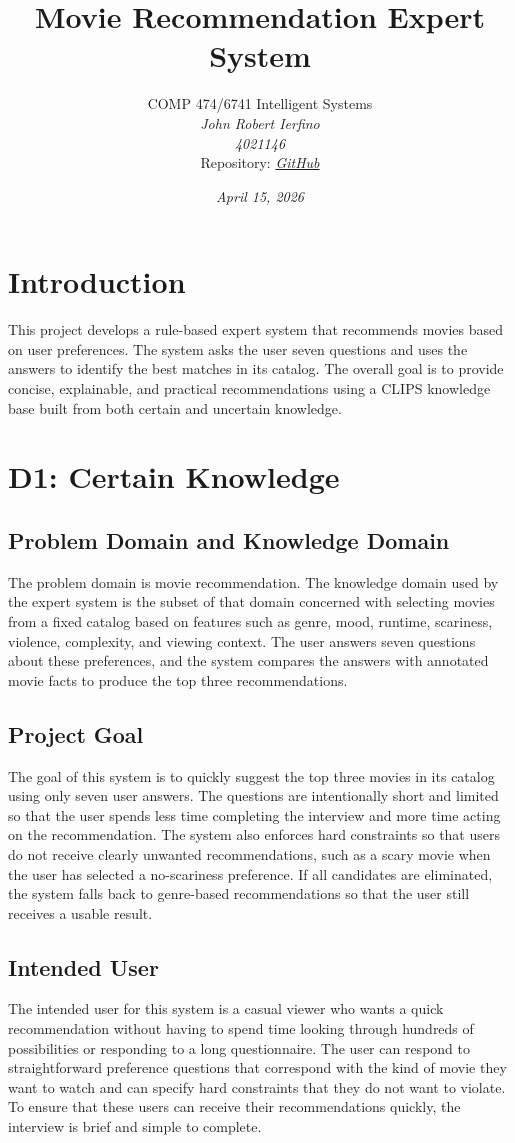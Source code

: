 \documentclass[11pt]{article}
\title{\textbf{Movie Recommendation Expert System}}
\author{
COMP 474/6741 Intelligent Systems\\
\textit{John Robert Ierfino}\\
\textit{4021146}\\
Repository: \href{https://github.com/jrierfino/Comp6741-clips-movie-recommender}{\textit{GitHub}}
}
\date{\textit{April 15, 2026}}
\begin{document}
\maketitle
\tableofcontents
\newpage

\section{Introduction}
This project develops a rule-based expert system that recommends movies based on user preferences. The system asks the user seven questions and uses the answers to identify the best matches in its catalog. The overall goal is to provide concise, explainable, and practical recommendations using a CLIPS knowledge base built from both certain and uncertain knowledge.

\section{D1: Certain Knowledge}

\subsection{Problem Domain and Knowledge Domain}
The problem domain is movie recommendation. The knowledge domain used by the expert system is the subset of that domain concerned with selecting movies from a fixed catalog based on features such as genre, mood, runtime, scariness, violence, complexity, and viewing context. The user answers seven questions about these preferences, and the system compares the answers with annotated movie facts to produce the top three recommendations.

\subsection{Project Goal}
The goal of this system is to quickly suggest the top three movies in its catalog using only seven user answers. The questions are intentionally short and limited so that the user spends less time completing the interview and more time acting on the recommendation. The system also enforces hard constraints so that users do not receive clearly unwanted recommendations, such as a scary movie when the user has selected a no-scariness preference. If all candidates are eliminated, the system falls back to genre-based recommendations so that the user still receives a usable result.

\subsection{Intended User}
The intended user for this system is a casual viewer who wants a quick recommendation without having to spend time looking through hundreds of possibilities or responding to a long questionnaire. The user can respond to straightforward preference questions that correspond with the kind of movie they want to watch and can specify hard constraints that they do not want to violate. To ensure that these users can receive their recommendations quickly, the interview is brief and simple to complete.
\end{document}
